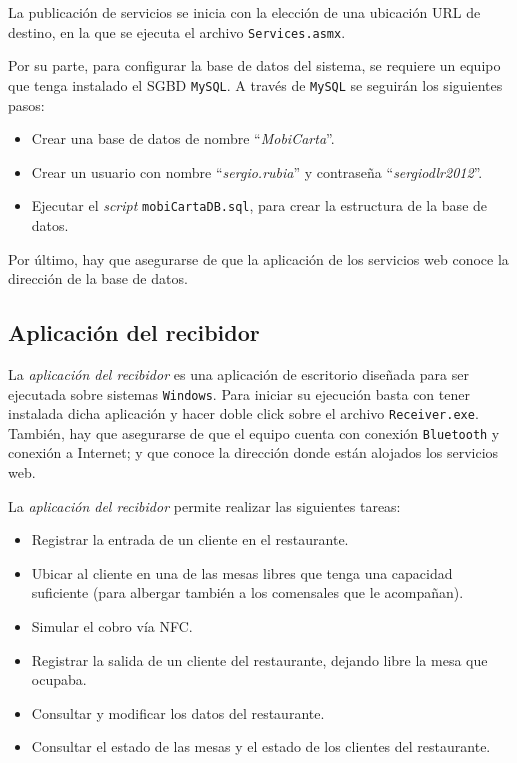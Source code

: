 La publicación de servicios se inicia con la elección de una ubicación
\acs{URL} de destino, en la que se ejecuta el archivo \texttt{Services.asmx}.

Por su parte, para configurar la base de datos del sistema, se requiere un
equipo que tenga instalado el \acs{SGBD} \texttt{MySQL}. A través de
\texttt{MySQL} se seguirán los siguientes pasos:
\begin{itemize}
\item Crear una base de datos de nombre ``\emph{MobiCarta}''.
\item Crear un usuario con nombre ``\emph{sergio.rubia}'' y contraseña
``\emph{sergiodlr2012}''.
\item Ejecutar el \emph{script} \texttt{mobiCartaDB.sql}, para crear la
estructura de la base de datos.
\end{itemize}

Por último, hay que asegurarse de que la aplicación de los servicios web
conoce la dirección de la base de datos.

\subsection{Aplicación del recibidor}
La \emph{aplicación del recibidor} es una aplicación de escritorio diseñada
para ser ejecutada sobre sistemas \texttt{Windows}. Para iniciar su ejecución
basta con tener instalada dicha aplicación y hacer doble click sobre el
archivo \texttt{Receiver.exe}. También, hay que asegurarse de que el equipo
cuenta con conexión \texttt{Bluetooth} y conexión a Internet; y que conoce la
dirección donde están alojados los servicios web.

La \emph{aplicación del recibidor} permite realizar las siguientes tareas:
\begin{itemize}
\item Registrar la entrada de un cliente en el restaurante.
\item Ubicar al cliente en una de las mesas libres que tenga una capacidad
suficiente (para albergar también a los comensales que le acompañan).
\item Simular el cobro vía \acs{NFC}.
\item Registrar la salida de un cliente del restaurante, dejando libre la
mesa que ocupaba.
\item Consultar y modificar los datos del restaurante.
\item Consultar el estado de las mesas y el estado de los clientes del
restaurante.
\end{itemize}

